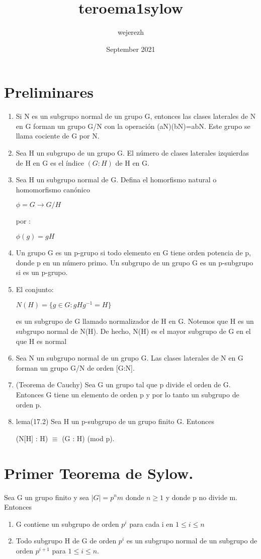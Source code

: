 \documentclass{article}
\title{teroema1sylow}
\author{wejerezh }
\date{September 2021}
\begin{document}
\section{Preliminares}
\begin{enumerate}
    \item Si N es un subgrupo normal de un grupo G, entonces las clases laterales de N en G forman un grupo G/N con la operación (aN)(bN)=abN. Este grupo se llama cociente de G por N.
    \item Sea H un subgrupo de un grupo G. El número de clases laterales izquierdas de H en G es el índice $(G: H)$ de H en G.
    \item Sea H un subgrupo normal de G. Defina el homorfismo natural o homomorfismo canónico
    \begin{center}
        $\phi = G \longrightarrow G/H$
    \end{center}
    por :
    \begin{center}
        $\phi(g)= gH$
    \end{center}
    \item Un grupo G es un  p-grupo si todo elemento en G tiene orden potencia de p, donde p en un número primo. Un subgrupo de un grupo G es un p-subgrupo si es un p-grupo.
    \item El conjunto:
    \begin{center}
        $N(H)=\{g \in G:gHg^{-1}=H\}$
    \end{center}
    es un subgrupo de G llamado normalizador de H en G. Notemos que H es un subgrupo normal de N(H). De hecho, N(H) es el mayor subgrupo de G en el que H es normal
    \item Sea N un subgrupo normal de un grupo G. Las clases laterales de N en G forman un grupo G/N de orden [G:N].
    \item (Teorema de Cauchy) Sea G un grupo tal que p divide el orden de G. Entonces G tiene un elemento de orden p y por lo tanto un subgrupo de orden p.
    \item lema(17.2) Sea H un p-subgrupo de un grupo finito G. Entonces
        \begin{center}
            (N[H] : H) $\equiv$ (G : H) (mod p).
        \end{center}
\end{enumerate}
\newpage
\section{Primer Teorema de Sylow.}
Sea G un grupo finito y sea $|G|=p^{n}m $ donde $n\geq 1$ y donde p no divide m. Entonces
\begin{enumerate}
    \item G contiene un subgrupo de orden $p^{i}$ para cada i en $1 \leq i \leq n$
    \item Todo subgrupo H de G de orden $p^{i}$ es un subgrupo normal de un subgrupo de orden $p^{i+1}$ para  $1 \leq i \leq n.$
\end{enumerate}
\end{document}
